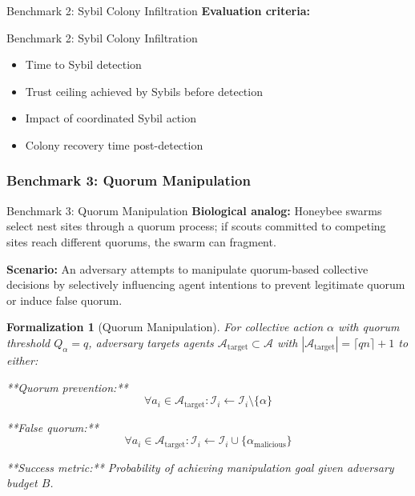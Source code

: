 \documentclass[
  ignorenonframetext,
]{beamer}
\providecommand{\tightlist}{%
  \setlength{\itemsep}{0pt}\setlength{\parskip}{0pt}}
\newtheorem{formalization}{Formalization}
\begin{document}
\begin{frame}[allowframebreaks]{Benchmark 2: Sybil Colony Infiltration}
\textbf{Evaluation criteria:}

\end{frame}

\begin{frame}[allowframebreaks]{Benchmark 2: Sybil Colony Infiltration}
\begin{itemize}
\tightlist
\item
  Time to Sybil detection
\item
  Trust ceiling achieved by Sybils before detection
\item
  Impact of coordinated Sybil action
\item
  Colony recovery time post-detection
\end{itemize}
\end{frame}

\subsubsection{Benchmark 3: Quorum
Manipulation}\label{sec:benchmark-quorum}

\begin{frame}[allowframebreaks]{Benchmark 3: Quorum Manipulation}
\textbf{Biological analog:} Honeybee swarms select nest sites through a
quorum process; if scouts committed to competing sites reach different
quorums, the swarm can fragment.

\textbf{Scenario:} An adversary attempts to manipulate quorum-based
collective decisions by selectively influencing agent intentions to
prevent legitimate quorum or induce false quorum.

\begin{formalization}[Quorum Manipulation]
\label{form:quorum-manipulation}
For collective action $\alpha$ with quorum threshold $Q_\alpha = q$, adversary targets agents $\mathcal{A}_{\text{target}} \subset \mathcal{A}$ with $|\mathcal{A}_{\text{target}}| = \lceil qn \rceil + 1$ to either:

**Quorum prevention:**
\begin{equation}
\forall a_i \in \mathcal{A}_{\text{target}}: \mathcal{I}_i \gets \mathcal{I}_i \setminus \{\alpha\}
\label{eq:quorum-prevention}
\end{equation}

**False quorum:**
\begin{equation}
\forall a_i \in \mathcal{A}_{\text{target}}: \mathcal{I}_i \gets \mathcal{I}_i \cup \{\alpha_{\text{malicious}}\}
\label{eq:false-quorum-injection}
\end{equation}

**Success metric:** Probability of achieving manipulation goal given adversary budget $B$.
\end{formalization}

\end{frame}
\end{document}
